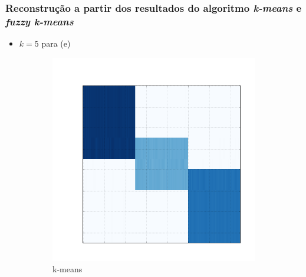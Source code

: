 \documentclass[10pt]{beamer}
\begin{document}
\begin{frame}
\frametitle{Reconstrução a partir dos resultados do algoritmo \textit{k-means} e \textit{fuzzy k-means}}
\begin{itemize}
  \item $k = 5$ para (e)
\end{itemize}
  \begin{figure}[H]
  \centering
      \begin{subfigure}[b]{0.3\textwidth}
          \includegraphics[width=\textwidth]{img/e-reconstruction-2-kmeans.png}
          \caption*{k-means}
      \end{subfigure}
      \begin{subfigure}[b]{0.3\textwidth}

\end{subfigure}
\end{figure}
\end{frame}
\end{document}
